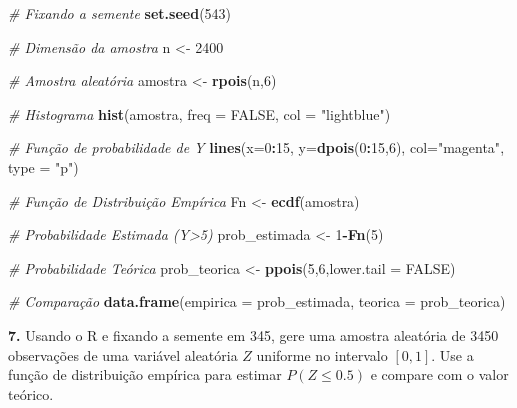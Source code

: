 \documentclass[
]{book}
\newenvironment{Shaded}{\begin{snugshade}}{\end{snugshade}}
\newcommand{\AttributeTok}[1]{\textcolor[rgb]{0.13,0.29,0.53}{#1}}
\newcommand{\CommentTok}[1]{\textcolor[rgb]{0.56,0.35,0.01}{\textit{#1}}}
\newcommand{\ConstantTok}[1]{\textcolor[rgb]{0.56,0.35,0.01}{#1}}
\newcommand{\DecValTok}[1]{\textcolor[rgb]{0.00,0.00,0.81}{#1}}
\newcommand{\FunctionTok}[1]{\textcolor[rgb]{0.13,0.29,0.53}{\textbf{#1}}}
\newcommand{\NormalTok}[1]{#1}
\newcommand{\OtherTok}[1]{\textcolor[rgb]{0.56,0.35,0.01}{#1}}
\newcommand{\SpecialCharTok}[1]{\textcolor[rgb]{0.81,0.36,0.00}{\textbf{#1}}}
\newcommand{\StringTok}[1]{\textcolor[rgb]{0.31,0.60,0.02}{#1}}
\begin{document}
\begin{Shaded}
\begin{Highlighting}[]
\CommentTok{\# Fixando a semente}
\FunctionTok{set.seed}\NormalTok{(}\DecValTok{543}\NormalTok{)}

\CommentTok{\# Dimensão da amostra}
\NormalTok{n }\OtherTok{\textless{}{-}} \DecValTok{2400}

\CommentTok{\# Amostra aleatória}
\NormalTok{amostra }\OtherTok{\textless{}{-}} \FunctionTok{rpois}\NormalTok{(n,}\DecValTok{6}\NormalTok{)}

\CommentTok{\# Histograma}
\FunctionTok{hist}\NormalTok{(amostra, }\AttributeTok{freq =} \ConstantTok{FALSE}\NormalTok{, }\AttributeTok{col =} \StringTok{"lightblue"}\NormalTok{)}

\CommentTok{\# Função de probabilidade de Y}
\FunctionTok{lines}\NormalTok{(}\AttributeTok{x=}\DecValTok{0}\SpecialCharTok{:}\DecValTok{15}\NormalTok{, }\AttributeTok{y=}\FunctionTok{dpois}\NormalTok{(}\DecValTok{0}\SpecialCharTok{:}\DecValTok{15}\NormalTok{,}\DecValTok{6}\NormalTok{), }\AttributeTok{col=}\StringTok{"magenta"}\NormalTok{, }\AttributeTok{type =} \StringTok{"p"}\NormalTok{)}

\CommentTok{\# Função de Distribuição Empírica}
\NormalTok{Fn }\OtherTok{\textless{}{-}} \FunctionTok{ecdf}\NormalTok{(amostra)}

\CommentTok{\# Probabilidade Estimada (Y\textgreater{}5)}
\NormalTok{prob\_estimada }\OtherTok{\textless{}{-}} \DecValTok{1}\SpecialCharTok{{-}}\FunctionTok{Fn}\NormalTok{(}\DecValTok{5}\NormalTok{)}

\CommentTok{\# Probabilidade Teórica}
\NormalTok{prob\_teorica }\OtherTok{\textless{}{-}} \FunctionTok{ppois}\NormalTok{(}\DecValTok{5}\NormalTok{,}\DecValTok{6}\NormalTok{,}\AttributeTok{lower.tail =} \ConstantTok{FALSE}\NormalTok{)}

\CommentTok{\# Comparação}
\FunctionTok{data.frame}\NormalTok{(}\AttributeTok{empirica =}\NormalTok{ prob\_estimada, }\AttributeTok{teorica =}\NormalTok{ prob\_teorica)}
\end{Highlighting}
\end{Shaded}

\textbf{7.} Usando o R e fixando a semente em 345, gere uma amostra aleatória
de 3450 observações de uma variável aleatória \(Z\) uniforme no intervalo
\([0, 1]\). Use a função de distribuição empírica para estimar
\(P(Z \leq 0.5)\) e compare com o valor teórico.
\end{document}

